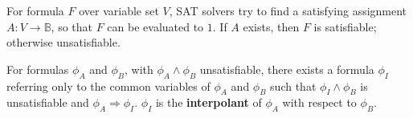 \documentclass[conference]{IEEEtran}
\begin{document}

For formula $F$ over variable set $V$,
SAT solvers try to find a satisfying assignment $A:V\to \mathbb{B}$,
so that $F$ can be evaluated to $1$.
If $A$ exists, then $F$ is satisfiable;
otherwise unsatisfiable.

 




For formulas $\phi_A$ and $\phi_B$,
with $\phi_A\wedge \phi_B$ unsatisfiable,
there exists a formula $\phi_I$ referring only
to the common variables of $\phi_A$ and $\phi_B$ such that $\phi_I\wedge \phi_B$ is unsatisfiable 
and $\phi_A\Rightarrow \phi_I$.
$\phi_I$ is the \textbf{interpolant} \cite{Craig} of $\phi_A$ with respect to $\phi_B$.
\end{document}
